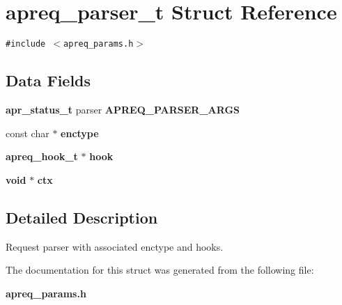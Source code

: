 \section{apreq\_\-parser\_\-t  Struct Reference}
\label{structapreq__parser__t}
{\tt \#include $<$apreq\_\-params.h$>$}

\subsection*{Data Fields}
\begin{CompactItemize}
\item 
{}
{\bf apr\_\-status\_\-t} parser {\bf APREQ\_\-PARSER\_\-ARGS}\label{structapreq__parser__t_m0}

\item 
{}
const char $\ast$ {\bf enctype}\label{structapreq__parser__t_m1}

\item 
{}
{\bf apreq\_\-hook\_\-t} $\ast$ {\bf hook}\label{structapreq__parser__t_m2}

\item 
{}
{\bf void} $\ast$ {\bf ctx}\label{structapreq__parser__t_m3}

\end{CompactItemize}


\subsection{Detailed Description}
Request parser with associated enctype and hooks. 



The documentation for this struct was generated from the following file:\begin{CompactItemize}
\item 
{\bf apreq\_\-params.h}\end{CompactItemize}
